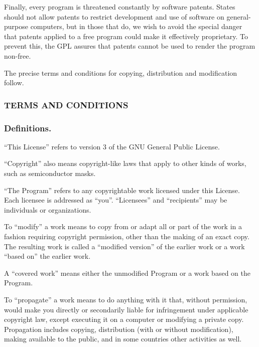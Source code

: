 \documentclass[10pt,english]{article}
\begin{document}
Finally, every program is threatened constantly by software patents.
States should not allow patents to restrict development and use of
software on general-purpose computers, but in those that do, we wish
to avoid the special danger that patents applied to a free program
could make it effectively proprietary. To prevent this, the GPL assures
that patents cannot be used to render the program non-free.

The precise terms and conditions for copying, distribution and modification
follow.


\subsubsection*{TERMS AND CONDITIONS}


\subsubsection*{Definitions.}

\textquotedblleft{}This License\textquotedblright{} refers to version
3 of the GNU General Public License.

\textquotedblleft{}Copyright\textquotedblright{} also means copyright-like
laws that apply to other kinds of works, such as semiconductor masks.

\textquotedblleft{}The Program\textquotedblright{} refers to any copyrightable
work licensed under this License. Each licensee is addressed as \textquotedblleft{}you\textquotedblright{}.
\textquotedblleft{}Licensees\textquotedblright{} and \textquotedblleft{}recipients\textquotedblright{}
may be individuals or organizations.

To \textquotedblleft{}modify\textquotedblright{} a work means to copy
from or adapt all or part of the work in a fashion requiring copyright
permission, other than the making of an exact copy. The resulting
work is called a \textquotedblleft{}modified version\textquotedblright{}
of the earlier work or a work \textquotedblleft{}based on\textquotedblright{}
the earlier work.

A \textquotedblleft{}covered work\textquotedblright{} means either
the unmodified Program or a work based on the Program.

To \textquotedblleft{}propagate\textquotedblright{} a work means to
do anything with it that, without permission, would make you directly
or secondarily liable for infringement under applicable copyright
law, except executing it on a computer or modifying a private copy.
Propagation includes copying, distribution (with or without modification),
making available to the public, and in some countries other activities
as well.
\end{document}
